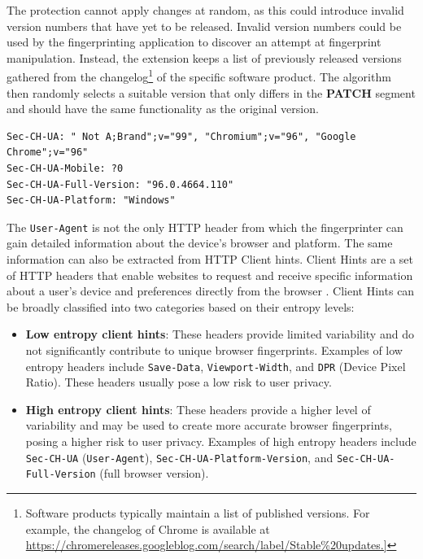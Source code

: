 The protection cannot apply changes at random, as this could introduce invalid version numbers that have yet to be released. Invalid version numbers could be used by the fingerprinting application to discover an attempt at fingerprint manipulation. Instead, the extension keeps a list of previously released versions gathered from the changelog\footnote{Software products typically maintain a list of published versions. For example, the changelog of Chrome is available at \url{https://chromereleases.googleblog.com/search/label/Stable\%20updates.]}} of the specific software product. The algorithm then randomly selects a suitable version that only differs in the \textbf{PATCH} segment and should have the same functionality as the original version.

\bigbreak

\begin{lstlisting}[caption={An example of HTTP Client hints \cite{MDN}.}, label={Listing:HTTPClientHintsExample}]
Sec-CH-UA: " Not A;Brand";v="99", "Chromium";v="96", "Google Chrome";v="96"
Sec-CH-UA-Mobile: ?0
Sec-CH-UA-Full-Version: "96.0.4664.110"
Sec-CH-UA-Platform: "Windows"
\end{lstlisting}

\medbreak

The \texttt{User-Agent} is not the only HTTP header from which the fingerprinter can gain detailed information about the device's browser and platform. The same information can also be extracted from HTTP Client hints. Client Hints are a set of HTTP headers that enable websites to request and receive specific information about a user's device and preferences directly from the browser \cite{MDN}. Client Hints can be broadly classified into two categories based on their entropy levels:

\begin{itemize}
	\item \textbf{Low entropy client hints}: These headers provide limited variability and do not significantly contribute to unique browser fingerprints. Examples of low entropy headers include \texttt{Save-Data}, \texttt{Viewport-Width}, and \texttt{DPR} (Device Pixel Ratio). These headers usually pose a low risk to user privacy.
	\item \textbf{High entropy client hints}: These headers provide a higher level of variability and may be used to create more accurate browser fingerprints, posing a higher risk to user privacy. Examples of high entropy headers include \texttt{Sec-CH-UA} (\texttt{User-Agent}), \texttt{Sec-CH-UA-Platform-Version}, and \texttt{Sec-CH-UA-Full-Version} (full browser version).
\end{itemize}


